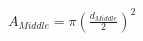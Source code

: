 \documentclass[preview]{standalone}
\begin{document}
\begin{align*}
A_{Middle} = \pi \left(\frac{d_{Middle}}{2}\right)^2
\end{align*}
\end{document}
